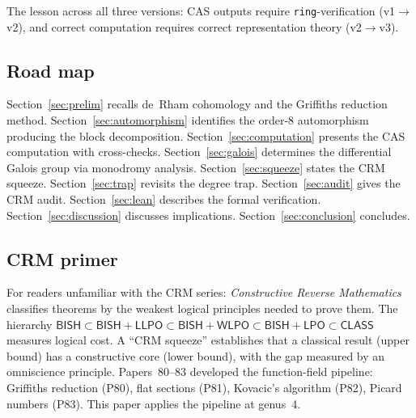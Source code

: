 \documentclass[11pt]{article}
\theoremstyle{plain}
\theoremstyle{definition}
\theoremstyle{remark}
\newcommand{\BISH}{\ensuremath{\mathsf{BISH}}}
\newcommand{\LPO}{\ensuremath{\mathsf{LPO}}}
\newcommand{\WLPO}{\ensuremath{\mathsf{WLPO}}}
\newcommand{\LLPO}{\ensuremath{\mathsf{LLPO}}}
\newcommand{\CLASS}{\ensuremath{\mathsf{CLASS}}}
\begin{document}
The lesson across all three versions: CAS outputs require
\texttt{ring}-verification (v1$\to$v2), and correct computation
requires correct representation theory (v2$\to$v3).

\subsection{Road map}

Section~\ref{sec:prelim} recalls de~Rham cohomology and the Griffiths
reduction method. Section~\ref{sec:automorphism} identifies the order-8
automorphism producing the block decomposition.
Section~\ref{sec:computation} presents the CAS computation with
cross-checks. Section~\ref{sec:galois} determines the differential
Galois group via monodromy analysis.
Section~\ref{sec:squeeze} states the CRM squeeze.
Section~\ref{sec:trap} revisits the degree trap.
Section~\ref{sec:audit} gives the CRM audit.
Section~\ref{sec:lean} describes the formal verification.
Section~\ref{sec:discussion} discusses implications.
Section~\ref{sec:conclusion} concludes.

\subsection{CRM primer}\label{sec:primer}

For readers unfamiliar with the CRM series: \emph{Constructive Reverse
Mathematics} classifies theorems by the weakest logical principles
needed to prove them. The hierarchy $\BISH \subset \BISH + \LLPO
\subset \BISH + \WLPO \subset \BISH + \LPO \subset \CLASS$ measures
logical cost. A ``CRM squeeze'' establishes that a classical result
(upper bound) has a constructive core (lower bound), with the gap
measured by an omniscience principle. Papers~80--83 developed the
function-field pipeline: Griffiths reduction (P80), flat sections
(P81), Kovacic's algorithm (P82), Picard numbers (P83). This paper
applies the pipeline at genus~4.
\end{document}
